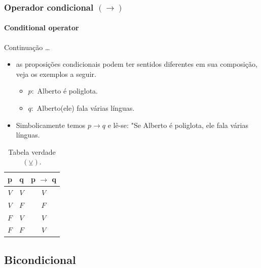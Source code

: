 \documentclass[10pt, headsepline, captions=tableabove, xcolor=table]{beamer}
\begin{document}
\begin{frame}[t]
    \frametitle{Operador condicional $(\rightarrow)$ }
    \framesubtitle{Conditional operator}
    \begin{block}{Continuação \dots}
        \begin{itemize}
            \item as proposições condicionais podem ter sentidos diferentes em sua composição, veja os exemplos a seguir.
            \begin{itemize}
                \item[] $p:$ Alberto é poliglota.
                \item[] $q:$ Alberto(ele) fala várias línguas.
            \end{itemize}
            \item Simbolicamente temos $p \rightarrow q$ e lê-se: "Se Alberto é poliglota, ele fala várias línguas.
        \end{itemize}
    \end{block}
    \vspace{-5mm}
    \begin{table}[ht]
        \caption{Tabela verdade $(\veebar)$.}
        \label{tab:tabela-condicao}
        \begin{tabular}{|c|c|c|}
        \hline
        \rowcolor[HTML]{EFEFEF} 
        \textbf{p} & \textbf{q} & \textbf{p $\rightarrow$ q} \\ \hline
        $V$        & $V$        & $V$                        \\ \hline
        $V$        & $F$        & $F$                        \\ \hline
        $F$        & $V$        & $V$                        \\ \hline
        $F$        & $F$        & $V$                        \\ \hline
        \end{tabular}
    \end{table}
\end{frame}
%
\subsection{Bicondicional}
%
\end{document}
